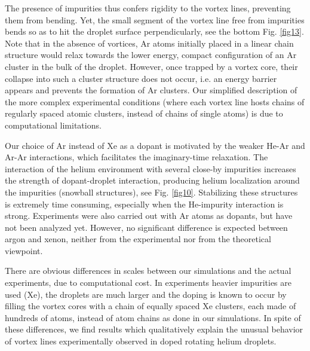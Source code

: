 The presence of impurities thus confers rigidity to the vortex lines,
preventing them from bending. Yet, the small segment of the vortex line free from impurities bends so as to hit 
the droplet surface perpendicularly, see the bottom Fig. \ref{fig13}.
Note that in the absence of vortices, Ar atoms initially placed
in a linear chain structure would relax towards the lower energy, compact 
configuration of an Ar cluster in the bulk of the droplet.
However, once trapped by a vortex core, their collapse 
into such a cluster structure does not occur,
i.e. an energy barrier appears and prevents the formation of Ar
clusters. 
Our simplified 
description of the more complex experimental 
conditions (where each vortex line hosts chains of regularly spaced
atomic clusters, instead of chains of single atoms)
is due to computational limitations.

Our choice of Ar instead of Xe as a dopant is motivated by the weaker He-Ar and Ar-Ar interactions, which 
facilitates the imaginary-time relaxation. The interaction of the helium environment with several close-by impurities increases the 
strength of  dopant-droplet interaction, producing  
helium localization around the impurities (snowball structures), see Fig. \ref{fig10}.  Stabilizing these
structures is extremely time consuming, 
especially when the He-impurity interaction is strong.
Experiments were also carried out with Ar atoms as dopants, 
but have not been analyzed yet.\cite{note}
However, no significant difference is expected between argon and xenon, 
neither from the experimental nor from the theoretical viewpoint.

There are obvious differences in scales between our simulations and  
 the actual experiments,  due to  computational 
cost. In experiments heavier impurities are used (Xe), 
the droplets are much larger
and the doping is known to occur by filling the vortex cores with a chain 
of equally spaced Xe clusters, each made of
hundreds of atoms, instead of atom chains as done in our simulations.
In spite of these differences, we find results which  
qualitatively explain the unusual behavior of vortex lines 
experimentally observed in doped rotating helium droplets.

